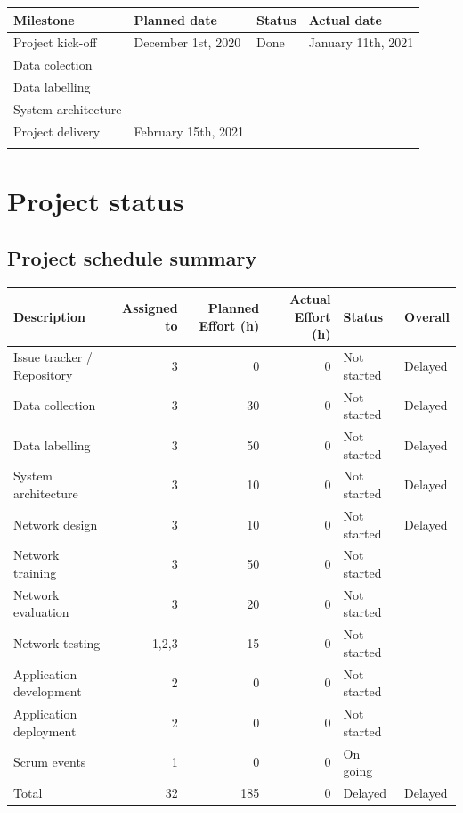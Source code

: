 \documentclass{article}
\begin{document}
\begin{center}
\begin{tabular}{llll}
Milestone & Planned date & Status & Actual date\\
\hline
Project kick-off & December 1st, 2020 & Done & January 11th, 2021\\
Data colection &  &  & \\
Data labelling &  &  & \\
System architecture &  &  & \\
Project delivery & February 15th, 2021 &  & \\
 &  &  & \\
\end{tabular}
\end{center}

\section{Project status}
\label{sec:org6a49499}

\subsection{Project schedule summary}
\label{sec:org17cef63}

\begin{center}
\begin{tabular}{lrrrll}
Description & Assigned to & Planned Effort (h) & Actual Effort (h) & Status & Overall\\
\hline
Issue tracker / Repository & 3 & 0 & 0 & Not started & Delayed\\
Data collection & 3 & 30 & 0 & Not started & Delayed\\
Data labelling & 3 & 50 & 0 & Not started & Delayed\\
System architecture & 3 & 10 & 0 & Not started & Delayed\\
Network design & 3 & 10 & 0 & Not started & Delayed\\
Network training & 3 & 50 & 0 & Not started & \\
Network evaluation & 3 & 20 & 0 & Not started & \\
Network testing & 1,2,3 & 15 & 0 & Not started & \\
Application development & 2 & 0 & 0 & Not started & \\
Application deployment & 2 & 0 & 0 & Not started & \\
Scrum events & 1 & 0 & 0 & On going & \\
\hline
Total & 32 & 185 & 0 & Delayed & Delayed\\
\end{tabular}
\end{center}
\end{document}
